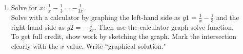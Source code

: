 \documentclass[12pt, oneside]{article}
\begin{document}
\begin{enumerate}
\newpage



\item Solve for $x$: $\displaystyle \frac{1}{x} - \frac{1}{3} =-\frac{1}{3x}$\\[10pt]%
Solve with a calculator by graphing the left-hand side as $\displaystyle y1=\frac{1}{x} - \frac{1}{3}$ and the right hand side as $y2=-\frac{1}{3x}$. Then use the calculator graph-solve function.\\[1in]
To get full credit, show work by sketching the graph. Mark the intersection clearly with the $x$ value. Write ``graphical solution."
\begin{center}
\end{center}

\newpage

\end{enumerate}
\end{document}
